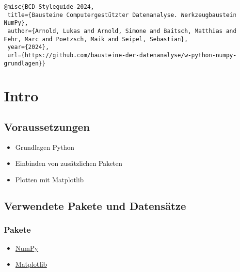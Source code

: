 \documentclass[
  letterpaper,
  DIV=11,
  numbers=noendperiod]{scrreprt}
\providecommand{\tightlist}{%
  \setlength{\itemsep}{0pt}\setlength{\parskip}{0pt}}\usepackage{longtable,booktabs,array}
\begin{document}
\begin{tcolorbox}
\begin{verbatim}
@misc{BCD-Styleguide-2024,
 title={Bausteine Computergestützter Datenanalyse. Werkzeugbaustein NumPy},
 author={Arnold, Lukas and Arnold, Simone and Baitsch, Matthias and Fehr, Marc and Poetzsch, Maik and Seipel, Sebastian},
 year={2024},
 url={https://github.com/bausteine-der-datenanalyse/w-python-numpy-grundlagen}} 
\end{verbatim}

\chapter*{Intro}\label{intro}


\section*{Voraussetzungen}\label{voraussetzungen-1}


\begin{itemize}
\tightlist
\item
  Grundlagen Python
\item
  Einbinden von zusätzlichen Paketen
\item
  Plotten mit Matplotlib
\end{itemize}

\section*{Verwendete Pakete und
Datensätze}\label{verwendete-pakete-und-datensuxe4tze}


\subsection*{Pakete}\label{pakete}

\begin{itemize}
\tightlist
\item
  \href{https://numpy.org/}{NumPy}
\item
  \href{https://matplotlib.org/}{Matplotlib}
\end{itemize}


\end{tcolorbox}
\end{document}

